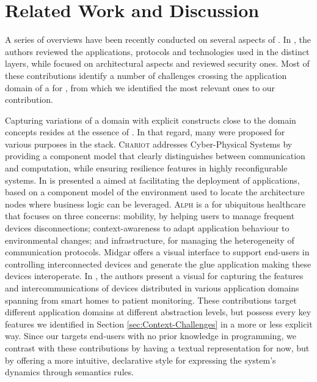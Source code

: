 \section{Related Work and Discussion}
\label{sec:RW}

A series of overviews have been recently conducted on several aspects of \IOT. In \cite{alfuqaha-15,xu-14a}, the authors reviewed the applications, protocols and technologies used in the distinct \IOT layers, while \cite{singh-14,gubbi-13} focused on architectural aspects and \cite{tan-10,xu-14b} reviewed security ones. Most of these contributions identify a number of challenges crossing the application domain of a \DSL for \IOT, from which we identified the most relevant ones to our contribution.

Capturing variations of a domain with explicit constructs close to the domain concepts resides at the essence of \DSLS. In that regard, many \DSLS were proposed for various purposes in the \IOT stack. \textsc{Chariot} \cite{pradhan-15} addresses Cyber-Physical Systems by providing a component model that clearly distinguishes between communication and computation, while ensuring resilience features in highly reconfigurable systems. In \cite{brandtzaeg-12} is presented a \DSL aimed at facilitating the deployment of applications, based on a component model of the environment used to locate the architecture nodes where business logic can be leveraged. \textsc{Alph} \cite{munnelly-08} is a \DSL for ubiquitous healthcare that focuses on three concerns: mobility, by helping users to manage frequent devices disconnections; context-awareness to adapt application behaviour to environmental changes; and infrastructure, for managing the heterogeneity of communication protocols. Midgar \cite{garcia-14} offers a visual interface to support end-users in controlling interconnected devices and generate the glue application making these devices interoperate. In \cite{salihbegovic-15}, the authors present a visual \DSL for capturing the features and intercommunications of devices distributed in various application domains spanning from smart homes to patient monitoring. These contributions target different application domains at different abstraction levels, but possess every key features we identified in Section \ref{sec:Context-Challenges} in a more or less explicit way. Since our \DSL targets end-users with no prior knowledge in programming, we contrast with these contributions by having a textual representation for now, but by offering a more intuitive, declarative style for expressing the system's dynamics through semantics rules.

